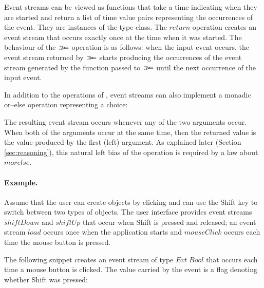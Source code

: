 \documentclass{sigplanconf}
\newcommand{\Conid}[1]{\mathit{#1}}
\newcommand{\Varid}[1]{\mathit{#1}}
\newcommand{\bind}{\mathbin{>\!\!\!>\mkern-6.7mu=}}
\def\resethooks{%
  \global\let\SaveRestoreHook\empty
  \global\let\ColumnHook\empty}
\let\hspre\empty
\let\hspost\empty
\begin{document}
Event streams can be viewed as functions that take a time indicating when they are started and return a list of 
time value pairs representing the occurrences of the event. They are instances of the  
type class. The \ensuremath{\Varid{return}} operation creates an event stream that occurs exactly once at the time when 
it was started. The behaviour of the \ensuremath{\bind } operation is as follows: when the input event occurs, the 
event stream returned by \ensuremath{\bind } starts producing the occurrences of the event stream generated by the 
function passed to \ensuremath{\bind } until the next occurrence of the input event.

In addition to the operations of , event streams can also implement a monadic or--else
operation representing a choice:

\begin{hscode}\SaveRestoreHook
\column{B}{@{}>{\hspre}l<{\hspost}@{}}%
\column{E}{@{}>{\hspre}l<{\hspost}@{}}%
\>[B]{}\Varid{morelse}\mathbin{::}\Conid{Evt}\;\Varid{a}\to \Conid{Evt}\;\Varid{a}\to \Conid{Evt}\;\Varid{a}{}\<[E]%
\ColumnHook
\end{hscode}\resethooks
The resulting event stream occurs whenever any of the two arguments occur. When both of the 
arguments occur at the same time, then the returned value is the value produced by the first (left)
argument. As explained later (Section \ref{sec:reasoning}), this natural left bias of the operation is 
required by a law about \ensuremath{\Varid{morelse}}.

\paragraph{Example.} Assume that the user can create objects by clicking and can use the Shift
key to switch between two types of objects. The user interface provides event 
streams \ensuremath{\Varid{shiftDown}} and \ensuremath{\Varid{shiftUp}} that occur when Shift is pressed and released; an event 
stream \ensuremath{\Varid{load}} occurs once when the application starts and \ensuremath{\Varid{mouseClick}} occurs each time the 
mouse button is pressed.

The following snippet creates an event stream of type \ensuremath{\Conid{Evt}\;\Conid{Bool}} that occurs each time a mouse 
button is clicked. The value carried by the event is a flag denoting whether Shift was
pressed:
\end{document}
